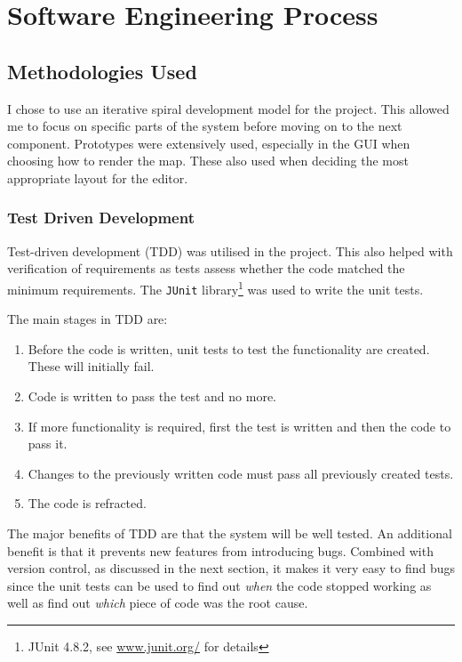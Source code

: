 \section{Software Engineering Process}

\subsection{Methodologies Used}
\label{sub:methodologies_used}

I chose to use an iterative spiral development model for the project. This allowed me to focus on specific parts of the system before moving on to the next component. 
Prototypes were extensively used, especially in the GUI when choosing how to render the map. These also used when deciding the most appropriate layout for the editor.

\subsubsection{Test Driven Development}
Test-driven development (TDD) was utilised in the project\cite{murphytest}. This also helped with verification of requirements as tests assess whether the code matched the minimum requirements. The \texttt{JUnit} library\footnote{JUnit 4.8.2, see \url{www.junit.org/} for details } was used to write the unit tests.  

The main stages in TDD are:\cite{desai2008survey}
\begin{enumerate}[noitemsep ]
	\item Before the code is written, unit tests to test the functionality are created. These will initially fail.
   \item Code is written to pass the test and no more.
   \item If more functionality is required, first the test is written and then the code to pass it.
   \item Changes to the previously written code must pass all previously created tests.
   \item The code is refracted. 
\end{enumerate}

The major benefits of TDD are that the system will be well tested.  An additional benefit is that  it  prevents new features from introducing bugs. Combined with version control, as discussed in the next section, it makes it very easy to find bugs since the unit tests can be used to find out \emph{when} the code stopped working as well as find out \emph{which} piece of code was the root cause.

